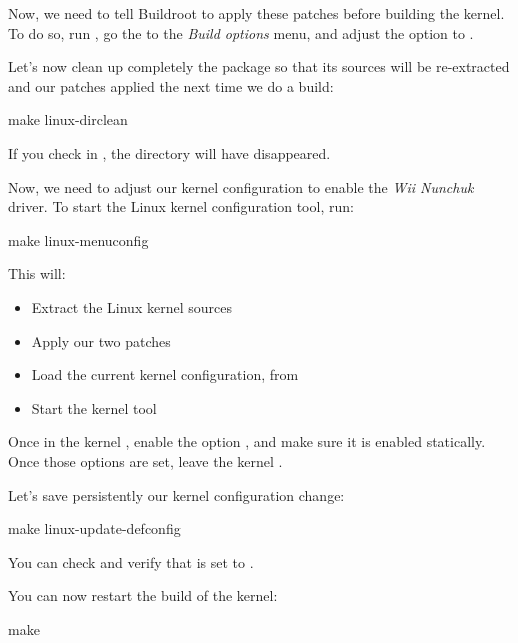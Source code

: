 Now, we need to tell Buildroot to apply these patches before building
the kernel. To do so, run , go the to the {\em Build
  options} menu, and adjust the  option
to .

Let's now clean up completely the  package so that its
sources will be re-extracted and our patches applied the next time we
do a build:

\begin{bashinput}
make linux-dirclean
\end{bashinput}

If you check in , the 
directory will have disappeared.

Now, we need to adjust our kernel configuration to enable the {\em Wii
Nunchuk} driver. To start the Linux kernel configuration tool, run:

\begin{bashinput}
make linux-menuconfig
\end{bashinput}

This will:

\begin{itemize}
\item Extract the Linux kernel sources
\item Apply our two patches
\item Load the current kernel configuration, from
\item Start the kernel  tool
\end{itemize}

Once in the kernel , enable the option
, and make sure it is enabled
statically. Once those options are set, leave the kernel
.

Let's save persistently our kernel configuration change:

\begin{bashinput}
make linux-update-defconfig
\end{bashinput}

You can check  and
verify that  is set to .

You can now restart the build of the kernel:

\begin{bashinput}
make
\end{bashinput}

